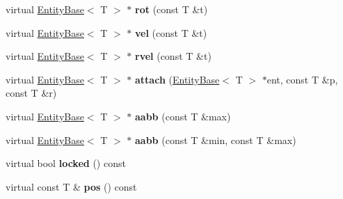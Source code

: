\begin{DoxyCompactItemize}
\item 
\hypertarget{classj3d_1_1base_1_1EntityBase_a755f372ef87b7491503cf7508c689acb}{}virtual \hyperlink{classj3d_1_1base_1_1EntityBase}{Entity\+Base}$<$ T $>$ $\ast$ {\bfseries rot} (const T \&t)\label{classj3d_1_1base_1_1EntityBase_a755f372ef87b7491503cf7508c689acb}

\item 
\hypertarget{classj3d_1_1base_1_1EntityBase_aab74f2504156f927a30d12483b9f1bc6}{}virtual \hyperlink{classj3d_1_1base_1_1EntityBase}{Entity\+Base}$<$ T $>$ $\ast$ {\bfseries vel} (const T \&t)\label{classj3d_1_1base_1_1EntityBase_aab74f2504156f927a30d12483b9f1bc6}

\item 
\hypertarget{classj3d_1_1base_1_1EntityBase_a9c4db4d13b9a894ce5b58fe42a4ee8e3}{}virtual \hyperlink{classj3d_1_1base_1_1EntityBase}{Entity\+Base}$<$ T $>$ $\ast$ {\bfseries rvel} (const T \&t)\label{classj3d_1_1base_1_1EntityBase_a9c4db4d13b9a894ce5b58fe42a4ee8e3}

\item 
\hypertarget{classj3d_1_1base_1_1EntityBase_a9928cc02583f5459adccb4fa77bbd969}{}virtual \hyperlink{classj3d_1_1base_1_1EntityBase}{Entity\+Base}$<$ T $>$ $\ast$ {\bfseries attach} (\hyperlink{classj3d_1_1base_1_1EntityBase}{Entity\+Base}$<$ T $>$ $\ast$ent, const T \&p, const T \&r)\label{classj3d_1_1base_1_1EntityBase_a9928cc02583f5459adccb4fa77bbd969}

\item 
\hypertarget{classj3d_1_1base_1_1EntityBase_a2062bc3ecc6dab95202f14987bcb3727}{}virtual \hyperlink{classj3d_1_1base_1_1EntityBase}{Entity\+Base}$<$ T $>$ $\ast$ {\bfseries aabb} (const T \&max)\label{classj3d_1_1base_1_1EntityBase_a2062bc3ecc6dab95202f14987bcb3727}

\item 
\hypertarget{classj3d_1_1base_1_1EntityBase_aac195b713d925cdac6faabc0260901a5}{}virtual \hyperlink{classj3d_1_1base_1_1EntityBase}{Entity\+Base}$<$ T $>$ $\ast$ {\bfseries aabb} (const T \&min, const T \&max)\label{classj3d_1_1base_1_1EntityBase_aac195b713d925cdac6faabc0260901a5}

\item 
\hypertarget{classj3d_1_1base_1_1EntityBase_a09879cf2b3b04d2e85cffb242c23aa60}{}virtual bool {\bfseries locked} () const \label{classj3d_1_1base_1_1EntityBase_a09879cf2b3b04d2e85cffb242c23aa60}

\item 
\hypertarget{classj3d_1_1base_1_1EntityBase_a9d2db3a52dcd08b24d2f39430396cd68}{}virtual const T \& {\bfseries pos} () const \label{classj3d_1_1base_1_1EntityBase_a9d2db3a52dcd08b24d2f39430396cd68}


\end{DoxyCompactItemize}
